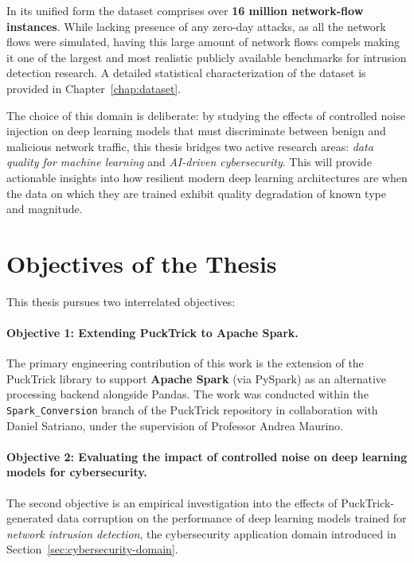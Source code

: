 \documentclass[../main.tex]{subfiles}
\begin{document}
In its unified form the dataset comprises over \textbf{16 million network-flow instances}. While lacking presence of any zero-day attacks, as all the network flows were simulated, having this large amount of network flows compels making it one of the largest and most realistic publicly available benchmarks for intrusion detection research.  A detailed statistical characterization of the dataset  is provided in Chapter~\ref{chap:dataset}.

The choice of this domain is deliberate: by studying the effects of controlled noise injection on deep learning models that must discriminate between benign and malicious network traffic, this thesis bridges two active research areas: \emph{data quality for machine learning} and \emph{AI-driven cybersecurity}. This will provide actionable insights into how resilient modern deep learning architectures are when the data on which they are trained exhibit quality degradation of known type and magnitude. 

\newpage
\section{Objectives of the Thesis}
\label{sec:objectives}

This thesis pursues two interrelated objectives:

\paragraph{Objective 1: Extending PuckTrick to Apache Spark.}
The primary engineering contribution of this work is the extension of the PuckTrick library to support \textbf{Apache Spark} (via PySpark) as an alternative processing backend alongside Pandas.  The work was conducted within the \texttt{Spark\_Conversion} branch of the PuckTrick repository in collaboration with Daniel Satriano, under the supervision of Professor Andrea Maurino.



\paragraph{Objective 2: Evaluating the impact of controlled noise on deep learning models for cybersecurity.}
The second objective is an empirical investigation into the effects of PuckTrick-generated data corruption on the performance of deep learning models trained for \emph{network intrusion detection}, the cybersecurity application domain introduced in Section~\ref{sec:cybersecurity-domain}.  
\end{document}
